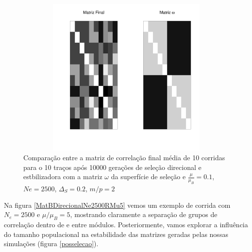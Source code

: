 \begin{center}
   \begin{figure}[htbp]
      \includegraphics[width=150mm, height=80mm]{figuras/RMu01Omega}
      \caption{Comparação entre a matriz de correlação final média de 10
         corridas para o 10 traços após 10000 gerações de seleção direcional e
         estbilizadora com a matriz $\omega$ da superfície de seleção e
         $\frac{\mu}{\mu_B}=0.1$, $Ne=2500$, $\Delta_S=0.2$, $m/p=2$}
      \label{RMu01}
   \end{figure}
\end{center}

Na figura \ref{MatBDirecionalNe2500RMu5} vemos um exemplo de corrida com
$N_e = 2500$ e $\mu/\mu_B=5$, mostrando claramente a separação de grupos
de correlação dentro de e entre módulos. 
Posteriormente, vamos explorar a influência do tamanho populacional na
estabilidade das matrizes geradas pelas nossas simulações (figura
\ref{posselecao}). 

